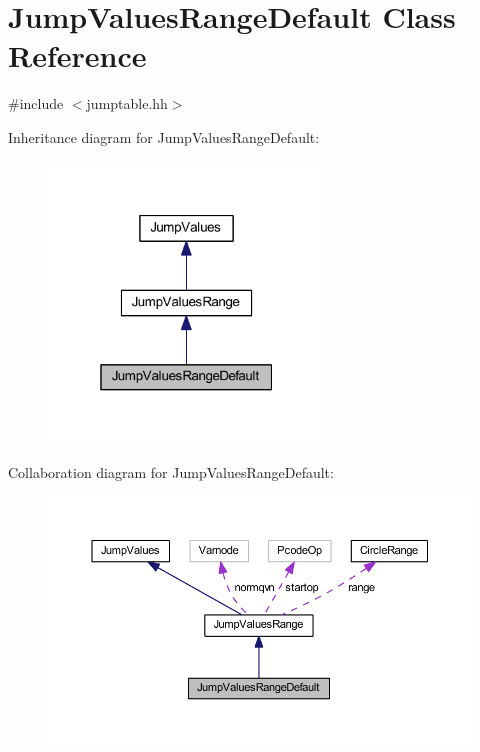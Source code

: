 \hypertarget{class_jump_values_range_default}{}\section{Jump\+Values\+Range\+Default Class Reference}
\label{class_jump_values_range_default}


{\ttfamily \#include $<$jumptable.\+hh$>$}



Inheritance diagram for Jump\+Values\+Range\+Default\+:
\nopagebreak
\begin{figure}[H]
\begin{center}
\leavevmode
\includegraphics[width=208pt]{class_jump_values_range_default__inherit__graph}
\end{center}
\end{figure}


Collaboration diagram for Jump\+Values\+Range\+Default\+:
\nopagebreak
\begin{figure}[H]
\begin{center}
\leavevmode
\includegraphics[width=350pt]{class_jump_values_range_default__coll__graph}
\end{center}
\end{figure}
